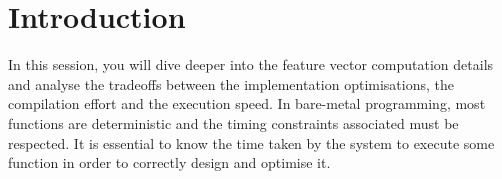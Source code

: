 \section*{Introduction}

In this session, you will dive deeper into the feature vector computation details and analyse the tradeoffs between the implementation optimisations, the compilation effort and the execution speed. In bare-metal programming, most functions are deterministic and the timing constraints associated must be respected. It is essential to know the time taken by the system to execute some function in order to correctly design and optimise it.
